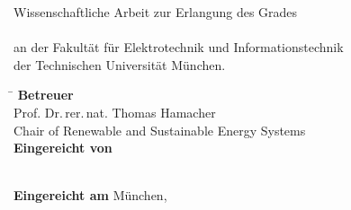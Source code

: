 

\begin{titlingpage}

\noindent
\hfill
\resizebox{!}{1cm}{\TUMlogo}
\vspace{3cm}

\noindent
\large \thesistype
\vspace{.5cm}

\noindent \bfseries \LARGE
\MyTitle

\vspace{.5cm}
\noindent \mdseries \large
\subtitle

\vspace{6cm}

\noindent \large 
Wissenschaftliche Arbeit zur Erlangung des Grades\\
\degree\\
an der Fakultät für Elektrotechnik und Informationstechnik\\
der Technischen Universität München.
\vspace{3cm}





\mdseries

\noindent
\normalsize

\noindent
\begin{tabbing}
\hspace{4cm}\=\kill
\textbf{Betreuer} \> \advisor\\[.1cm]
	\> Prof.  Dr.\,rer.\,nat. Thomas Hamacher\\[.1cm]
	\> Chair of Renewable and Sustainable Energy Systems\\[0.25cm] 
\textbf{Eingereicht von} \> \MyAuthor\\ [.1cm]
 \> \address\\[.1cm]
 \> \telephone\\[0.25cm] 
\textbf{Eingereicht am} \> München, \dateosub
\end{tabbing} 




\end{titlingpage}
